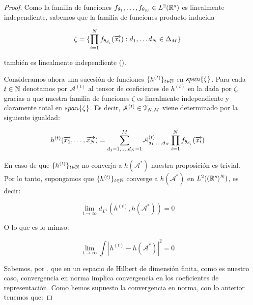 \begin{proof}
    Como la familia de funciones $f_{\theta_1}, \ldots, f_{\theta_M} \in L^2(\mathbb{R}^s)$ es linealmente independiente, sabemos que la familia de funciones producto inducida

    \begin{equation}
        \zeta = \{ \prod_{i = 1}^N f_{\theta_{d_i}}(\overrightarrow{x_i}): d_1, \ldots d_N \in \Delta_{M} \}
    \end{equation}

    también es linealmente independiente ().

    Consideramos ahora una sucesión de funciones $\{ h^{(t)} \}_{t \in \mathbb{N}}$ en $span\{ \zeta \}$. Para cada $t \in \mathbb{N}$ denotamos por $\mathcal{A}^{(t)}$ al tensor de coeficientes de $h^{(t)}$ en la  dada por $\zeta$, gracias a que nuestra familia de funciones $\zeta$ es linealmente independiente y claramente total en $span \{ \zeta \}$. Es decir, $\mathcal{A}^{(t)} \in \mathcal{T}_{N, M}$ viene determinado por la siguiente igualdad:

    \begin{equation}
        h^{(t)}(\overrightarrow{x_1}, \ldots, \overrightarrow{x_N}) = \sum_{d_1 = 1, \ldots, d_N = 1}^M \mathcal{A}^{(t)}_{d_1, \ldots, d_N} \prod_{i = 1}^N f_{\theta_{d_i}}(\overrightarrow{x_i})
    \end{equation}

    En caso de que $\{ h^{(t)} \}_{t \in \mathbb{N}}$ no converja a $h(\mathcal{A}^*)$ nuestra proposición es trivial. Por lo tanto, supongamos que $\{ h^{(t)} \}_{t \in \mathbb{N}}$ converge a $h(\mathcal{A}^*)$ en $L^2((\mathbb{R}^s)^N)$, es decir:

    \begin{equation}
        \lim_{t \to \infty} d_{L^2}(h^{(t)}, h(\mathcal{A}^*)) = 0
    \end{equation}

    O lo que es lo mimso:

    \begin{equation}
        \lim_{t \to \infty} \int | h^{(t)} - h(\mathcal{A}^*)|^2 = 0
    \end{equation}

    Sabemos, por , que en un espacio de Hilbert de dimensión finita, como es nuestro caso, convergencia en norma implica convergencia en los coeficientes de representación. Como hemos supuesto la convergencia en norma, con lo anterior tenemos que:


\end{proof}
